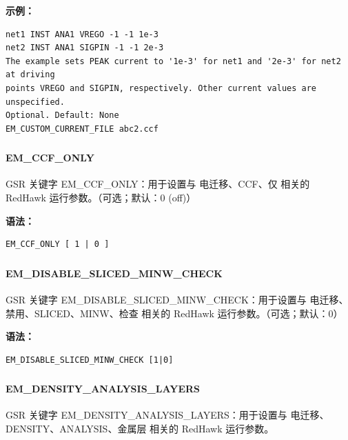 \textbf{示例：}
\begin{lstlisting}
net1 INST ANA1 VREGO -1 -1 1e-3
net2 INST ANA1 SIGPIN -1 -1 2e-3
The example sets PEAK current to '1e-3' for net1 and '2e-3' for net2 at driving
points VREGO and SIGPIN, respectively. Other current values are unspecified.
Optional. Default: None
EM_CUSTOM_CURRENT_FILE abc2.ccf
\end{lstlisting}

\subsubsection{}
\paragraph*{EM_CCF_ONLY}

GSR 关键字 EM_CCF_ONLY：用于设置与 电迁移、CCF、仅 相关的 RedHawk 运行参数。（可选；默认：0 (off)）

\textbf{语法：}
\begin{lstlisting}
EM_CCF_ONLY [ 1 | 0 ]
\end{lstlisting}

\subsubsection{}
\paragraph*{EM_DISABLE_SLICED_MINW_CHECK}

GSR 关键字 EM_DISABLE_SLICED_MINW_CHECK：用于设置与 电迁移、禁用、SLICED、MINW、检查 相关的 RedHawk 运行参数。（可选；默认：0）

\textbf{语法：}
\begin{lstlisting}
EM_DISABLE_SLICED_MINW_CHECK [1|0]
\end{lstlisting}

\subsubsection{}
\paragraph*{EM_DENSITY_ANALYSIS_LAYERS}

GSR 关键字 EM_DENSITY_ANALYSIS_LAYERS：用于设置与 电迁移、DENSITY、ANALYSIS、金属层 相关的 RedHawk 运行参数。

